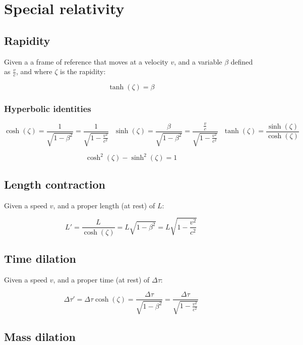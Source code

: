 \documentclass[12pt]{article}
\begin{document}
\newpage

\section{Special relativity}

\subsection{Rapidity}

Given a a frame of reference that moves at a velocity $v$, and a variable $\beta$ defined as $\frac{v}{c}$, and where $\zeta$ is the rapidity:

\[
\boxed{
\tanh(\zeta) = \beta
}
\]

\subsubsection{Hyperbolic identities}

\[
\boxed{
\cosh(\zeta) = \frac{1}{\sqrt{1 - \beta^2}} = \frac{1}{\sqrt{1-\frac{v^2}{c^2}}}
}\text{ }
\boxed{
\sinh(\zeta) = \frac{\beta}{\sqrt{1 - \beta^2}} = \frac{\frac{v}{c}}{\sqrt{1-\frac{v^2}{c^2}}}
}\text{ }
\boxed{
\tanh(\zeta) = \frac{\sinh(\zeta)}{\cosh(\zeta)}
}
\]

\[
\boxed{
\cosh^2(\zeta) - \sinh^2(\zeta) = 1
}
\]

\subsection{Length contraction}

Given a speed $v$, and a proper length (at rest) of $L$:

\[
\boxed{
L'=\frac{L}{\cosh(\zeta)}=L\sqrt{1 - \beta^2} = L\sqrt{1 - \frac{v^2}{c^2}}
}
\]

\subsection{Time dilation}

Given a speed $v$, and a proper time (at rest) of $\Delta\tau$:

\[
\boxed{
\Delta\tau' = \Delta\tau\cosh(\zeta) = \frac{\Delta\tau}{\sqrt{1 - \beta^2}} = \frac{\Delta\tau}{\sqrt{1 - \frac{v^2}{c^2}}}
}
\]

\subsection{Mass dilation}
\end{document}
